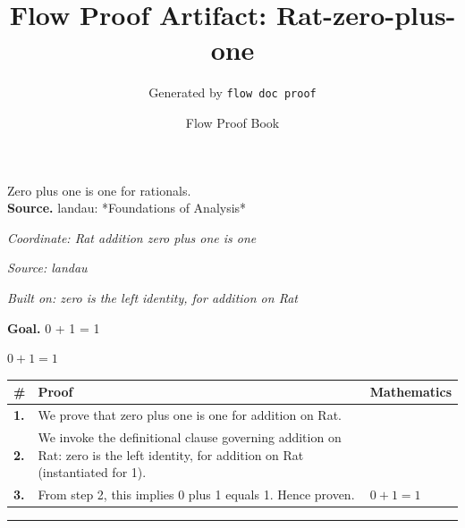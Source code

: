 \documentclass[11pt]{article}
\title{Flow Proof Artifact: Rat-zero-plus-one}
\author{Generated by \texttt{flow doc proof}}
\date{Flow Proof Book}
\theoremstyle{definition}
\begin{document}
\maketitle
Zero plus one is one for rationals.\\[0.5em]
\textbf{Source.} landau: *Foundations of Analysis*\\[0.5em]
\bigskip
{}\par
\smallskip\noindent\textit{Coordinate: Rat \cdot addition \cdot zero plus one is one}\par
\smallskip\noindent\textit{Source: landau}\par
\smallskip\noindent\textit{Built on: zero is the left identity, for addition on Rat}\par
\medskip
\noindent\textbf{Goal.} 0 + 1 = 1\par
\noindent$\displaystyle 0 + 1 = 1$\par
\medskip
\noindent
\begin{tabular}{@{} >{\raggedright\arraybackslash}p{} >{\raggedright\arraybackslash}p{} >{\raggedleft\arraybackslash}p{} @{}}
\textbf{\#} & \textbf{Proof} & \textbf{Mathematics} \\
\midrule
\textbf{1.} & We prove that zero plus one is one for addition on Rat. & \\[0.45em]
\textbf{2.} & We invoke the definitional clause governing addition on Rat: zero is the left identity, for addition on Rat (instantiated for 1). & \\[0.45em]
\textbf{3.} & From step 2, this implies 0 plus 1 equals 1. Hence proven. & $\displaystyle 0 + 1 = 1$ \\[0.45em]
\bottomrule
\end{tabular}
\label{thm:Rat-addition-zero_plus_one_is_one}
\par\medskip\hrule
\end{document}
